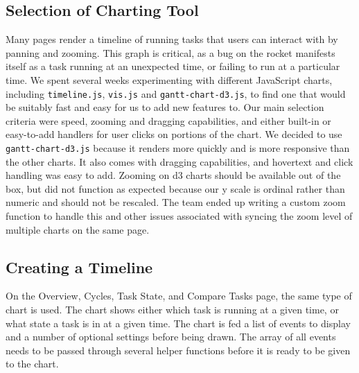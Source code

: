 \documentclass{hmcclinic}
\begin{document}
  \subsection{Selection of Charting Tool} %
  Many pages render a timeline of running tasks that users can interact
  with by panning and zooming. This graph is critical, as a bug on the rocket manifests
  itself as a task running at an unexpected time, or failing to run at a
  particular time. We spent several weeks experimenting with different
  JavaScript charts, including \texttt{timeline.js}, \texttt{vis.js} and
  \texttt{gantt-chart-d3.js},
  to find one that would be suitably fast and easy for us to add new
  features to. Our main selection criteria were speed, zooming and dragging
  capabilities, and either built-in or easy-to-add handlers for user clicks
  on portions of the chart. We decided to use \texttt{gantt-chart-d3.js} because it
  renders more quickly and is more responsive than the other charts. It
  also comes with dragging capabilities, and hovertext and
  click handling was easy to add. Zooming on d3 charts should be
  available out of the box, but did not function as expected because our y scale
  is ordinal rather than numeric and should not be rescaled. The team
  ended up writing a custom zoom function to handle this and other issues
  associated with syncing the zoom level of multiple charts on the same page.
  
  \subsection{Creating a Timeline}
  On the Overview, Cycles, Task State, and Compare Tasks page, the same type of
  chart is used. The chart shows either which task is running at a given time,
  or what state a task is in at a given time. The chart is fed a list of
  events to display and a number of optional settings before being drawn. The
  array of all events needs to be passed through several helper functions
  before it is ready to be given to the chart.
  
\end{document}
